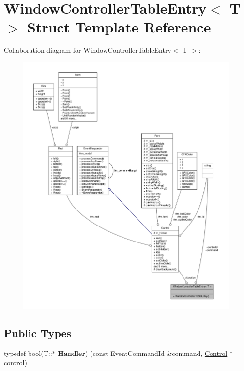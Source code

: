 \hypertarget{structWindowControllerTableEntry}{}\section{Window\+Controller\+Table\+Entry$<$ T $>$ Struct Template Reference}
\label{structWindowControllerTableEntry}


Collaboration diagram for Window\+Controller\+Table\+Entry$<$ T $>$\+:
\nopagebreak
\begin{figure}[H]
\begin{center}
\leavevmode
\includegraphics[width=350pt]{dd/dcc/structWindowControllerTableEntry__coll__graph}
\end{center}
\end{figure}
\subsection*{Public Types}
\begin{DoxyCompactItemize}
\item 
typedef bool(T\+::$\ast$ {\bfseries Handler}) (const Event\+Command\+Id \&command, \hyperlink{classControl}{Control} $\ast$control)\hypertarget{structWindowControllerTableEntry_a7ca773f1d5c0025e635164d9f23338f7}{}\label{structWindowControllerTableEntry_a7ca773f1d5c0025e635164d9f23338f7}

\end{DoxyCompactItemize}
